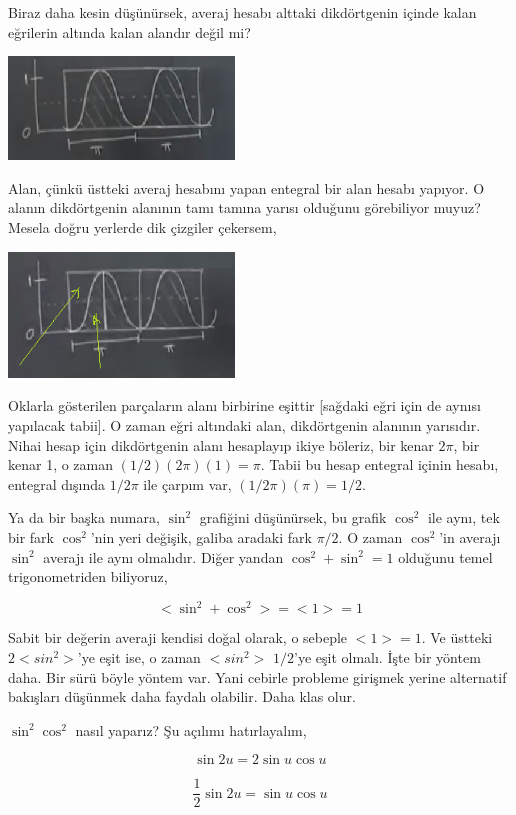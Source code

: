 \documentclass[12pt,fleqn]{article}\usepackage{../../common}
\begin{document}
Biraz daha kesin düşünürsek, averaj hesabı alttaki dikdörtgenin içinde kalan
eğrilerin altında kalan alandır değil mi?

\includegraphics[width=6cm]{11_04.png}

Alan, çünkü üstteki averaj hesabını yapan entegral bir alan hesabı yapıyor. O
alanın dikdörtgenin alanının tamı tamına yarısı olduğunu görebiliyor muyuz?
Mesela doğru yerlerde dik çizgiler çekersem,

\includegraphics[width=6cm]{11_05.png}

Oklarla gösterilen parçaların alanı birbirine eşittir [sağdaki eğri için de
  aynısı yapılacak tabii]. O zaman eğri altındaki alan, dikdörtgenin alanının
yarısıdır. Nihai hesap için dikdörtgenin alanı hesaplayıp ikiye böleriz, bir
kenar $2\pi$, bir kenar 1, o zaman $(1/2)(2\pi)(1) = \pi$. Tabii bu hesap
entegral içinin hesabı, entegral dışında $1/2\pi$ ile çarpım var, $(1/2\pi)
(\pi) = 1/2$.

Ya da bir başka numara, $\sin^2$ grafiğini düşünürsek, bu grafik $\cos^2$ ile
aynı, tek bir fark $\cos^2$'nin yeri değişik, galiba aradaki fark $\pi/2$. O
zaman $\cos^2$'in averajı $\sin^2$ averajı ile aynı olmalıdır. Diğer yandan
$\cos^2+\sin^2 = 1$ olduğunu temel trigonometriden biliyoruz,

$$ < \sin^2 + \cos^2 > = <1> = 1 $$

Sabit bir değerin averaji kendisi doğal olarak, o sebeple $<1>=1$. Ve üstteki
$2<sin^2>$'ye eşit ise, o zaman $<sin^2>$ $1/2$'ye eşit olmalı. İşte bir yöntem
daha. Bir sürü böyle yöntem var. Yani cebirle probleme girişmek yerine
alternatif bakışları düşünmek daha faydalı olabilir. Daha klas olur.

$\sin^2\cos^2$ nasıl yaparız? Şu açılımı hatırlayalım,

$$ \sin 2u = 2\sin u \cos u $$

$$ \frac{1}{2} \sin 2u = \sin u \cos u$$
\end{document}
